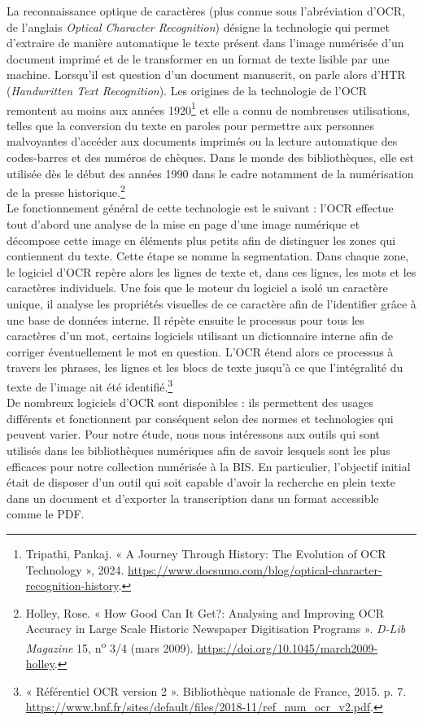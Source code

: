 \documentclass[a4paper,12pt,twoside]{book}
\begin{document}
La reconnaissance optique de caractères (plus connue sous l'abréviation
d'OCR, de l'anglais \emph{Optical Character Recognition}) désigne la
technologie qui permet d'extraire de manière automatique le texte
présent dans l'image numérisée d'un document imprimé et de le
transformer en un format de texte lisible par une machine. Lorsqu'il est
question d'un document manuscrit, on parle alors d'HTR
(\emph{Handwritten Text Recognition}). Les origines de la technologie de
l'OCR remontent au moins aux années 1920\footnote{Tripathi, Pankaj. « A
	Journey Through History: The Evolution of OCR Technology », 2024.
	\url{https://www.docsumo.com/blog/optical-character-recognition-history}.}
et elle a connu de nombreuses utilisations, telles que la conversion du
texte en paroles pour permettre aux personnes malvoyantes d'accéder aux
documents imprimés ou la lecture automatique des codes-barres et des
numéros de chèques. Dans le monde des bibliothèques, elle est utilisée
dès le début des années 1990 dans le cadre notamment de la numérisation
de la presse historique.\footnote{Holley, Rose. « How Good Can It Get?:
	Analysing and Improving OCR Accuracy in Large Scale Historic Newspaper
	Digitisation Programs ». \emph{D-Lib Magazine} 15,
	n\textsuperscript{o} 3/4 (mars 2009).
	\url{https://doi.org/10.1045/march2009-holley}.} \\

Le fonctionnement général de cette technologie est le suivant : l'OCR
effectue tout d'abord une analyse de la mise en page d'une image
numérique et décompose cette image en éléments plus petits afin de
distinguer les zones qui contiennent du texte. Cette étape se nomme la
segmentation. Dans chaque zone, le logiciel d'OCR repère alors les
lignes de texte et, dans ces lignes, les mots et les caractères
individuels. Une fois que le moteur du logiciel a isolé un caractère
unique, il analyse les propriétés visuelles de ce caractère afin de
l'identifier grâce à une base de données interne. Il répète ensuite le
processus pour tous les caractères d'un mot, certains logiciels
utilisant un dictionnaire interne afin de corriger éventuellement le mot
en question. L'OCR étend alors ce processus à travers les phrases, les
lignes et les blocs de texte jusqu'à ce que l'intégralité du texte de l'image ait
été identifié.\footnote{« Référentiel OCR version 2 ». Bibliothèque
	nationale de France, 2015. p. 7.
	\url{https://www.bnf.fr/sites/default/files/2018-11/ref_num_ocr_v2.pdf}.} \\

De nombreux logiciels d'OCR sont disponibles : ils permettent des usages
différents et fonctionnent par conséquent selon des normes et
technologies qui peuvent varier. Pour notre étude, nous nous intéressons
aux outils qui sont utilisés dans les bibliothèques numériques afin de
savoir lesquels sont les plus efficaces pour notre collection numérisée
à la BIS. En particulier, l'objectif initial était de disposer d'un outil qui soit capable d'avoir la recherche en plein texte dans un document et d'exporter la transcription dans un format accessible comme le PDF. \\
\end{document}
